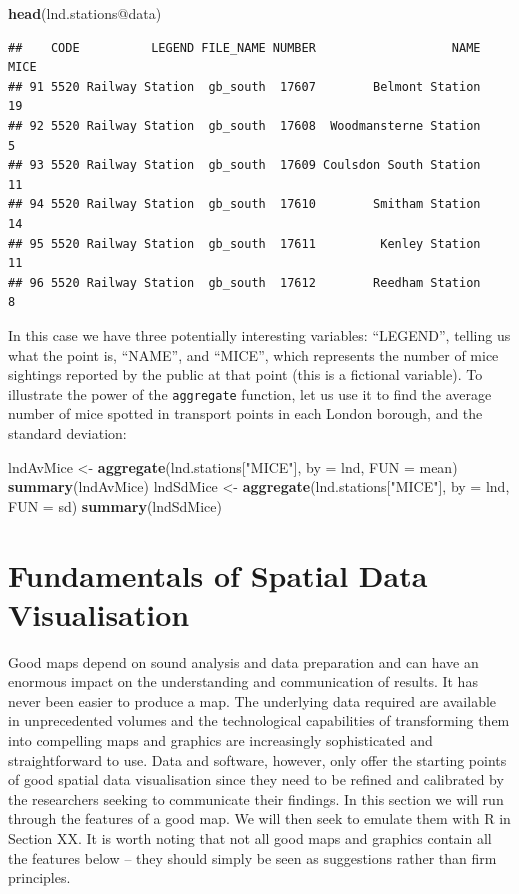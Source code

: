 \documentclass[]{article}
\newenvironment{Shaded}{}{}
\newcommand{\KeywordTok}[1]{\textcolor[rgb]{0.00,0.44,0.13}{\textbf{{#1}}}}
\newcommand{\DataTypeTok}[1]{\textcolor[rgb]{0.56,0.13,0.00}{{#1}}}
\newcommand{\StringTok}[1]{\textcolor[rgb]{0.25,0.44,0.63}{{#1}}}
\newcommand{\NormalTok}[1]{{#1}}
\begin{document}
\begin{Shaded}
\begin{Highlighting}[]
\KeywordTok{head}\NormalTok{(lnd.stations@data)}
\end{Highlighting}
\end{Shaded}
\begin{verbatim}
##    CODE          LEGEND FILE_NAME NUMBER                   NAME MICE
## 91 5520 Railway Station  gb_south  17607        Belmont Station   19
## 92 5520 Railway Station  gb_south  17608  Woodmansterne Station    5
## 93 5520 Railway Station  gb_south  17609 Coulsdon South Station   11
## 94 5520 Railway Station  gb_south  17610        Smitham Station   14
## 95 5520 Railway Station  gb_south  17611         Kenley Station   11
## 96 5520 Railway Station  gb_south  17612        Reedham Station    8
\end{verbatim}
In this case we have three potentially interesting variables:
``LEGEND'', telling us what the point is, ``NAME'', and ``MICE'', which
represents the number of mice sightings reported by the public at that
point (this is a fictional variable). To illustrate the power of the
\texttt{aggregate} function, let us use it to find the average number of
mice spotted in transport points in each London borough, and the
standard deviation:

\begin{Shaded}
\begin{Highlighting}[]
\NormalTok{lndAvMice <- }\KeywordTok{aggregate}\NormalTok{(lnd.stations[}\StringTok{"MICE"}\NormalTok{], }\DataTypeTok{by =} \NormalTok{lnd, }\DataTypeTok{FUN =} \NormalTok{mean)}
\KeywordTok{summary}\NormalTok{(lndAvMice)}
\NormalTok{lndSdMice <- }\KeywordTok{aggregate}\NormalTok{(lnd.stations[}\StringTok{"MICE"}\NormalTok{], }\DataTypeTok{by =} \NormalTok{lnd, }\DataTypeTok{FUN =} \NormalTok{sd)}
\KeywordTok{summary}\NormalTok{(lndSdMice)}
\end{Highlighting}
\end{Shaded}
\section{Fundamentals of Spatial Data Visualisation}

Good maps depend on sound analysis and data preparation and can have an
enormous impact on the understanding and communication of results. It
has never been easier to produce a map. The underlying data required are
available in unprecedented volumes and the technological capabilities of
transforming them into compelling maps and graphics are increasingly
sophisticated and straightforward to use. Data and software, however,
only offer the starting points of good spatial data visualisation since
they need to be refined and calibrated by the researchers seeking to
communicate their findings. In this section we will run through the
features of a good map. We will then seek to emulate them with R in
Section XX. It is worth noting that not all good maps and graphics
contain all the features below -- they should simply be seen as
suggestions rather than firm principles.
\end{document}
